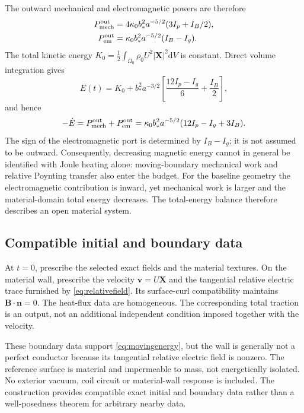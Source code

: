 \documentclass[11pt,a4paper]{article}
\theoremstyle{remark}\newtheorem{remark}{Remark}
\numberwithin{equation}{section}
\newcommand{\dd}{\mathrm{d}}
\newcommand{\vv}{\boldsymbol v}
\newcommand{\BB}{\boldsymbol B}
\newcommand{\XX}{\boldsymbol X}
\newcommand{\nn}{\boldsymbol n}
\begin{document}
The outward mechanical and electromagnetic powers are therefore
\begin{equation}
\begin{aligned}
P_{\rm mech}^{\rm out}&=4\kappa_0b_*^2a^{-5/2}(3I_p+I_B/2),\\
P_{\rm em}^{\rm out}&=\kappa_0b_*^2a^{-5/2}(I_B-I_g).
\end{aligned}
\label{eq:outwardpowers}
\end{equation}
The total kinetic energy $K_0=\frac12\int_{\Omega_0}\rho_0U^2|\XX|^2\dd V$ is constant. Direct volume integration gives
\begin{equation}
E(t)=K_0+b_*^2a^{-3/2}
\left[\frac{12I_p-I_g}{6}+\frac{I_B}{2}\right],
\label{eq:integratedenergy}
\end{equation}
and hence
\begin{equation}
-\dot E=P_{\rm mech}^{\rm out}+P_{\rm em}^{\rm out}
=\kappa_0b_*^2a^{-5/2}(12I_p-I_g+3I_B).
\label{eq:globalenergy}
\end{equation}
The sign of the electromagnetic port is determined by $I_B-I_g$; it is not assumed to be outward. Consequently, decreasing magnetic energy cannot in general be identified with Joule heating alone: moving-boundary mechanical work and relative Poynting transfer also enter the budget. For the baseline geometry the electromagnetic contribution is inward, yet mechanical work is larger and the material-domain total energy decreases. The total-energy balance therefore describes an open material system.

\subsection{Compatible initial and boundary data}\label{sec:boundary}
At $t=0$, prescribe the selected exact fields and the material textures. On the material wall, prescribe the velocity $\vv=U\XX$ and the tangential relative electric trace furnished by \eqref{eq:relativefield}. Its surface-curl compatibility maintains $\BB\cdot\nn=0$. The heat-flux data are homogeneous. The corresponding total traction is an output, not an additional independent condition imposed together with the velocity.

These boundary data support \eqref{eq:movingenergy}, but the wall is generally not a perfect conductor because its tangential relative electric field is nonzero. The reference surface is material and impermeable to mass, not energetically isolated. No exterior vacuum, coil circuit or material-wall response is included. The construction provides compatible exact initial and boundary data rather than a well-posedness theorem for arbitrary nearby data.
\end{document}
